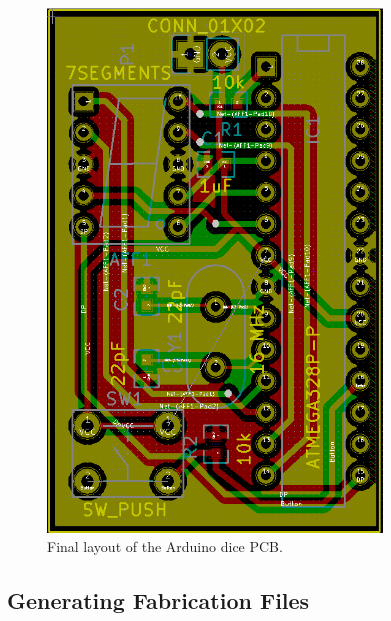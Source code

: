 \documentclass[12pt,letterpaper]{scrartcl}
\begin{document}
\begin{enumerate}
	\begin{figure}[hp]
		\centering
		\includegraphics[width=3.5in]{layout-final}
		\caption{Final layout of the Arduino dice PCB.}
		\label{fig:layout-final}
	\end{figure}
\end{enumerate}

\subsection{Generating Fabrication Files}
\label{sec:gerber}

\end{document}
